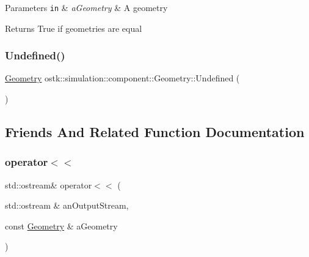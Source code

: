 \begin{DoxyParams}[1]{Parameters}
\mbox{\tt in}  & {\em a\+Geometry} & A geometry \\
\hline
\end{DoxyParams}
\begin{DoxyReturn}{Returns}
True if geometries are equal 
\end{DoxyReturn}
\mbox{\label{classostk_1_1simulation_1_1component_1_1_geometry_aea7bd504788b09119889a7cc70c88703}} 
\subsubsection{\texorpdfstring{Undefined()}{Undefined()}}
{\footnotesize\ttfamily \hyperlink{classostk_1_1simulation_1_1component_1_1_geometry}{Geometry} ostk\+::simulation\+::component\+::\+Geometry\+::\+Undefined (\begin{DoxyParamCaption}{ }\end{DoxyParamCaption})\hspace{0.3cm}{\ttfamily [static]}}



\subsection{Friends And Related Function Documentation}
\mbox{\label{classostk_1_1simulation_1_1component_1_1_geometry_aebfe5b9b5d8cd3dd8a2cfd140a1df583}} 
\subsubsection{\texorpdfstring{operator$<$$<$}{operator<<}}
{\footnotesize\ttfamily std\+::ostream\& operator$<$$<$ (\begin{DoxyParamCaption}\item[{std\+::ostream \&}]{an\+Output\+Stream,  }\item[{const \hyperlink{classostk_1_1simulation_1_1component_1_1_geometry}{Geometry} \&}]{a\+Geometry }\end{DoxyParamCaption})\hspace{0.3cm}{\ttfamily [friend]}}



